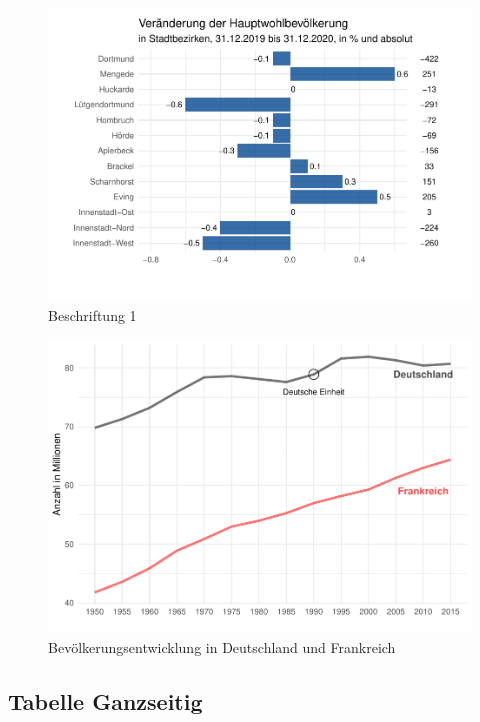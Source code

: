 \documentclass[
  a4paper,
  twoside]{article}
\begin{document}
\begin{figure}
\includegraphics[width=1\linewidth]{2021-03-02_Beispiel_files/figure-latex/unnamed-chunk-4-1} \caption{Beschriftung 1}\label{fig:unnamed-chunk-4}
\end{figure}

\begin{figure}
\includegraphics[width=1\linewidth]{2021-03-02_Beispiel_files/figure-latex/unnamed-chunk-5-1} \caption{Bevölkerungsentwicklung in Deutschland und Frankreich}\label{fig:unnamed-chunk-5}
\end{figure}

\newpage

\hypertarget{tabelle-ganzseitig}{%
\subsection{Tabelle Ganzseitig}\label{tabelle-ganzseitig}}
\end{document}
